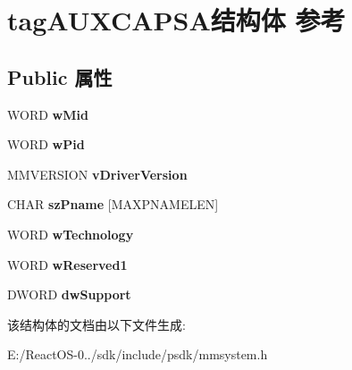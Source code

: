 \hypertarget{structtag_a_u_x_c_a_p_s_a}{}\section{tag\+A\+U\+X\+C\+A\+P\+S\+A结构体 参考}
\label{structtag_a_u_x_c_a_p_s_a}
\subsection*{Public 属性}
\begin{DoxyCompactItemize}
\item 
\mbox{\label{structtag_a_u_x_c_a_p_s_a_a66580ed1a7b0d9899ab62f8272d76ce4}} 
W\+O\+RD {\bfseries w\+Mid}
\item 
\mbox{\label{structtag_a_u_x_c_a_p_s_a_a345edd4f06056c9cbc66191b0736c848}} 
W\+O\+RD {\bfseries w\+Pid}
\item 
\mbox{\label{structtag_a_u_x_c_a_p_s_a_ad7c7d48d740bfb2e57ed621bbfdd78f1}} 
M\+M\+V\+E\+R\+S\+I\+ON {\bfseries v\+Driver\+Version}
\item 
\mbox{\label{structtag_a_u_x_c_a_p_s_a_a9845453b2a70f0b45a42f1e5dfad90a5}} 
C\+H\+AR {\bfseries sz\+Pname} \mbox{[}M\+A\+X\+P\+N\+A\+M\+E\+L\+EN\mbox{]}
\item 
\mbox{\label{structtag_a_u_x_c_a_p_s_a_af1bc4976c6bf5da5b0c8231be7fa92bf}} 
W\+O\+RD {\bfseries w\+Technology}
\item 
\mbox{\label{structtag_a_u_x_c_a_p_s_a_a5d5ac86e059e022dabddb43994af5ef7}} 
W\+O\+RD {\bfseries w\+Reserved1}
\item 
\mbox{\label{structtag_a_u_x_c_a_p_s_a_a750e1b2b2d032036b10672070a164cd5}} 
D\+W\+O\+RD {\bfseries dw\+Support}
\end{DoxyCompactItemize}


该结构体的文档由以下文件生成\+:\begin{DoxyCompactItemize}
\item 
E\+:/\+React\+O\+S-\/0../sdk/include/psdk/mmsystem.\+h\end{DoxyCompactItemize}
